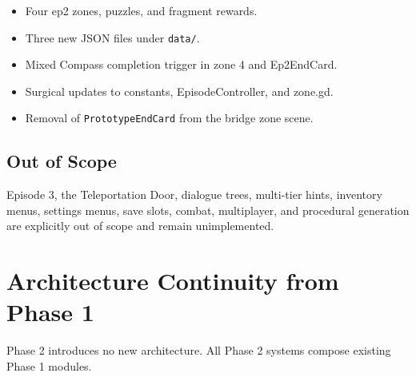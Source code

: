\documentclass[12pt, a4paper]{article}
\begin{document}
\begin{itemize}[nosep]
  \item Four ep2 zones, puzzles, and fragment rewards.
  \item Three new JSON files under \texttt{data/}.
  \item Mixed Compass completion trigger in zone 4 and Ep2EndCard.
  \item Surgical updates to constants, EpisodeController, and zone.gd.
  \item Removal of \texttt{PrototypeEndCard} from the bridge zone scene.
\end{itemize}

\subsection{Out of Scope}

Episode 3, the Teleportation Door, dialogue trees, multi-tier hints, inventory
menus, settings menus, save slots, combat, multiplayer, and procedural
generation are explicitly out of scope and remain unimplemented.

\section{Architecture Continuity from Phase 1}

Phase 2 introduces no new architecture. All Phase 2 systems compose existing
Phase 1 modules.
\end{document}
